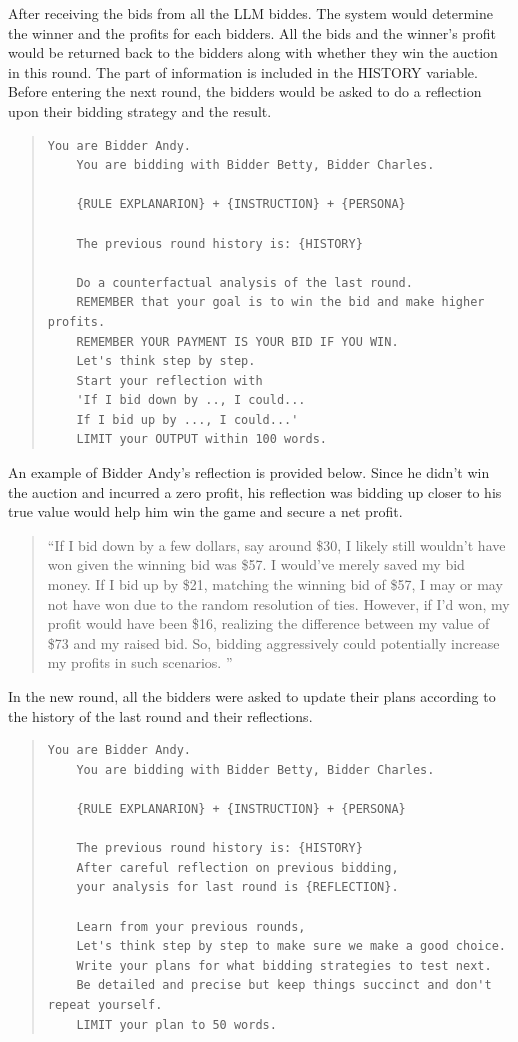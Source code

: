 \documentclass{article} %
\begin{document}
After receiving the bids from all the LLM biddes. The system would determine the winner and the profits for each bidders. All the bids and the winner's profit would be returned back to the bidders along with whether they win the auction in this round. The part of information is included in the HISTORY variable. Before entering the next round, the bidders would be asked to do a reflection upon their bidding strategy and the result.
\begin{quote}
\begin{lstlisting}[basicstyle=\ttfamily]
    You are Bidder Andy.            
    You are bidding with Bidder Betty, Bidder Charles.     
    
    {RULE EXPLANARION} + {INSTRUCTION} + {PERSONA} 

    The previous round history is: {HISTORY}
    
    Do a counterfactual analysis of the last round. 
    REMEMBER that your goal is to win the bid and make higher profits. 
    REMEMBER YOUR PAYMENT IS YOUR BID IF YOU WIN. 
    Let's think step by step. 
    Start your reflection with 
    'If I bid down by .., I could... 
    If I bid up by ..., I could...' 
    LIMIT your OUTPUT within 100 words. 
\end{lstlisting}
\end{quote}

An example of Bidder Andy's reflection is provided below. Since he didn't win the auction and incurred a zero profit, his reflection was bidding up closer to his true value would help him win the game and secure a net profit.
\begin{quote}
    ``If I bid down by a few dollars, say around \$30, I likely still wouldn't have won given the winning bid was \$57. I would've merely saved my bid money. If I bid up by \$21, matching the winning bid of \$57, I may or may not have won due to the random resolution of ties. However, if I'd won, my profit would have been \$16, realizing the difference between my value of \$73 and my raised bid. So, bidding aggressively could potentially increase my profits in such scenarios. ''
\end{quote}

In the new round, all the bidders were asked to update their plans according to the history of the last round and their reflections.
\begin{quote}
\begin{lstlisting}[basicstyle=\ttfamily]
    You are Bidder Andy.            
    You are bidding with Bidder Betty, Bidder Charles.     
    
    {RULE EXPLANARION} + {INSTRUCTION} + {PERSONA} 

    The previous round history is: {HISTORY}
    After careful reflection on previous bidding,
    your analysis for last round is {REFLECTION}. 
    
    Learn from your previous rounds, 
    Let's think step by step to make sure we make a good choice. 
    Write your plans for what bidding strategies to test next.
    Be detailed and precise but keep things succinct and don't repeat yourself. 
    LIMIT your plan to 50 words. 
\end{lstlisting}
\end{quote}
\end{document}
